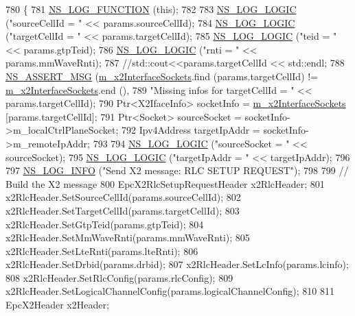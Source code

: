 \begin{DoxyCode}
780 \{
781   \hyperlink{log-macros-disabled_8h_a90b90d5bad1f39cb1b64923ea94c0761}{NS\_LOG\_FUNCTION} (\textcolor{keyword}{this});
782 
783   \hyperlink{group__logging_ga88acd260151caf2db9c0fc84997f45ce}{NS\_LOG\_LOGIC} (\textcolor{stringliteral}{"sourceCellId = "} << params.sourceCellId);
784   \hyperlink{group__logging_ga88acd260151caf2db9c0fc84997f45ce}{NS\_LOG\_LOGIC} (\textcolor{stringliteral}{"targetCellId = "} << params.targetCellId);
785   \hyperlink{group__logging_ga88acd260151caf2db9c0fc84997f45ce}{NS\_LOG\_LOGIC} (\textcolor{stringliteral}{"teid  = "} << params.gtpTeid);
786   \hyperlink{group__logging_ga88acd260151caf2db9c0fc84997f45ce}{NS\_LOG\_LOGIC} (\textcolor{stringliteral}{"rnti = "} << params.mmWaveRnti);
787 \textcolor{comment}{//std::cout<<params.targetCellId << std::endl;}
788   \hyperlink{assert_8h_aff5ece9066c74e681e74999856f08539}{NS\_ASSERT\_MSG} (\hyperlink{classns3_1_1EpcX2_a0665276228b9b99a52ef6d5e9bdb306d}{m\_x2InterfaceSockets}.find (params.targetCellId) != 
      \hyperlink{classns3_1_1EpcX2_a0665276228b9b99a52ef6d5e9bdb306d}{m\_x2InterfaceSockets}.end (),
789                  \textcolor{stringliteral}{"Missing infos for targetCellId = "} << params.targetCellId);
790   Ptr<X2IfaceInfo> socketInfo = \hyperlink{classns3_1_1EpcX2_a0665276228b9b99a52ef6d5e9bdb306d}{m\_x2InterfaceSockets} [params.targetCellId];
791   Ptr<Socket> sourceSocket = socketInfo->m\_localCtrlPlaneSocket;
792   Ipv4Address targetIpAddr = socketInfo->m\_remoteIpAddr;
793 
794   \hyperlink{group__logging_ga88acd260151caf2db9c0fc84997f45ce}{NS\_LOG\_LOGIC} (\textcolor{stringliteral}{"sourceSocket = "} << sourceSocket);
795   \hyperlink{group__logging_ga88acd260151caf2db9c0fc84997f45ce}{NS\_LOG\_LOGIC} (\textcolor{stringliteral}{"targetIpAddr = "} << targetIpAddr);
796 
797   \hyperlink{group__logging_gafbd73ee2cf9f26b319f49086d8e860fb}{NS\_LOG\_INFO} (\textcolor{stringliteral}{"Send X2 message: RLC SETUP REQUEST"});
798 
799   \textcolor{comment}{// Build the X2 message}
800   EpcX2RlcSetupRequestHeader x2RlcHeader;
801   x2RlcHeader.SetSourceCellId(params.sourceCellId);
802   x2RlcHeader.SetTargetCellId(params.targetCellId);
803   x2RlcHeader.SetGtpTeid(params.gtpTeid);
804   x2RlcHeader.SetMmWaveRnti(params.mmWaveRnti);
805   x2RlcHeader.SetLteRnti(params.lteRnti);
806   x2RlcHeader.SetDrbid(params.drbid);
807   x2RlcHeader.SetLcInfo(params.lcinfo);
808   x2RlcHeader.SetRlcConfig(params.rlcConfig);
809   x2RlcHeader.SetLogicalChannelConfig(params.logicalChannelConfig);
810 
811   EpcX2Header x2Header;

\end{DoxyCode}
